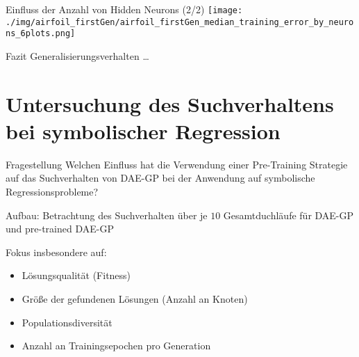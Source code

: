 \documentclass[
  ignorenonframetext,
]{beamer}
\providecommand{\tightlist}{%
  \setlength{\itemsep}{0pt}\setlength{\parskip}{0pt}}
\begin{document}
\begin{frame}{Einfluss der Anzahl von Hidden Neurons (2/2)}
\protect\hypertarget{einfluss-der-anzahl-von-hidden-neurons-22}{}
\texttt{[image: ./img/airfoil\_firstGen/airfoil\_firstGen\_median\_training\_error\_by\_neurons\_6plots.png]}
\end{frame}

\begin{frame}{Fazit Generalisierungsverhalten}
\protect\hypertarget{fazit-generalisierungsverhalten}{}
\ldots{}
\end{frame}

\hypertarget{untersuchung-des-suchverhaltens-bei-symbolischer-regression}{%
\section{Untersuchung des Suchverhaltens bei symbolischer
Regression}\label{untersuchung-des-suchverhaltens-bei-symbolischer-regression}}

\begin{frame}{Fragestellung}
\protect\hypertarget{fragestellung-1}{}
Welchen Einfluss hat die Verwendung einer Pre-Training Strategie auf das
Suchverhalten von DAE-GP bei der Anwendung auf symbolische
Regressionsprobleme?

Aufbau: Betrachtung des Suchverhalten über je \(10\) Gesamtduchläufe für
DAE-GP und pre-trained DAE-GP

Fokus insbesondere auf:

\begin{itemize}
\tightlist
\item
  Lösungsqualität (Fitness)
\item
  Größe der gefundenen Lösungen (Anzahl an Knoten)
\item
  Populationsdiversität
\item
  Anzahl an Trainingsepochen pro Generation
\end{itemize}
\end{frame}
\end{document}
